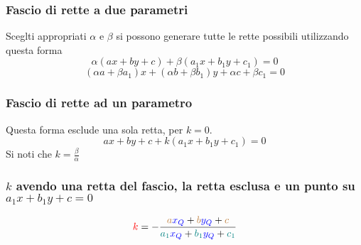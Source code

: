 \subsubsection{Fascio di rette a due parametri}
Sceglti appropriati $\alpha$ e $\beta$ si possono generare tutte le rette possibili utilizzando questa
forma
\begin{equation*}
  \alpha(ax + by + c) + \beta(a_1x + b_1y + c_1) = 0
\end{equation*}
\begin{equation*}
  (\alpha a + \beta a_1)x + (\alpha b + \beta b_1)y + \alpha c + \beta c_1 = 0
\end{equation*}

\subsubsection{Fascio di rette ad un parametro}
Questa forma esclude una sola retta, per $k = 0$.
\begin{equation*}
  ax + by + c + k(a_1x + b_1y + c_1) = 0
\end{equation*}
Si noti che $k = \frac{\beta}{\alpha}$

\subsubsection{$k$ avendo una retta del fascio, la retta esclusa e un punto su $a_1x + b_1y + c = 0$}
\begin{center}
\end{center}
\begin{equation*}
  \mathcolor{red}{k} = -\frac{
    \mathcolor{brown}{a}\mathcolor{blue}{x_Q} + \mathcolor{brown}{b}\mathcolor{blue}{y_Q} +
    \mathcolor{brown}{c}
    }{
    \mathcolor{teal}{a_1}\mathcolor{blue}{x_Q} + \mathcolor{teal}{b_1}\mathcolor{blue}{y_Q} +
    \mathcolor{teal}{c_1}
  }
\end{equation*}

